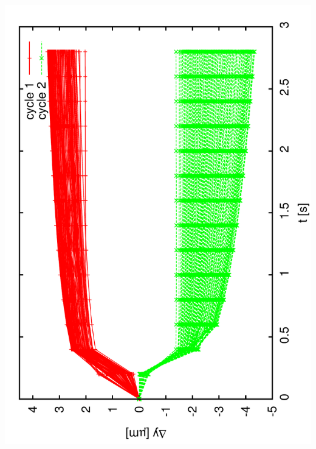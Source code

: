 \documentclass[a4paper,11pt]{book}
\begin{document}
 \includegraphics[angle=-90,scale=0.16]{image34.pdf}\\
\end{document}
